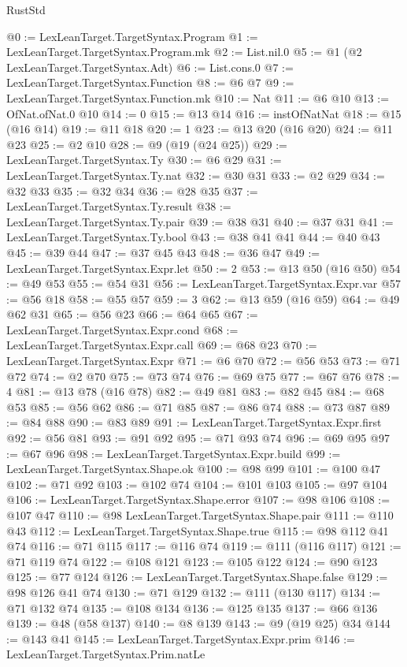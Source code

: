 \begin{lexlean}{RustStd}
\begin{coremodule}
@0 := LexLeanTarget.TargetSyntax.Program
@1 := LexLeanTarget.TargetSyntax.Program.mk
@2 := List.nil.{0}
@5 := @1 (@2 LexLeanTarget.TargetSyntax.Adt)
@6 := List.cons.{0}
@7 := LexLeanTarget.TargetSyntax.Function
@8 := @6 @7
@9 := LexLeanTarget.TargetSyntax.Function.mk
@10 := Nat
@11 := @6 @10
@13 := OfNat.ofNat.{0} @10
@14 := 0
@15 := @13 @14
@16 := instOfNatNat
@18 := @15 (@16 @14)
@19 := @11 @18
@20 := 1
@23 := @13 @20 (@16 @20)
@24 := @11 @23
@25 := @2 @10
@28 := @9 (@19 (@24 @25))
@29 := LexLeanTarget.TargetSyntax.Ty
@30 := @6 @29
@31 := LexLeanTarget.TargetSyntax.Ty.nat
@32 := @30 @31
@33 := @2 @29
@34 := @32 @33
@35 := @32 @34
@36 := @28 @35
@37 := LexLeanTarget.TargetSyntax.Ty.result
@38 := LexLeanTarget.TargetSyntax.Ty.pair
@39 := @38 @31
@40 := @37 @31
@41 := LexLeanTarget.TargetSyntax.Ty.bool
@43 := @38 @41 @41
@44 := @40 @43
@45 := @39 @44
@47 := @37 @45 @43
@48 := @36 @47
@49 := LexLeanTarget.TargetSyntax.Expr.let
@50 := 2
@53 := @13 @50 (@16 @50)
@54 := @49 @53
@55 := @54 @31
@56 := LexLeanTarget.TargetSyntax.Expr.var
@57 := @56 @18
@58 := @55 @57
@59 := 3
@62 := @13 @59 (@16 @59)
@64 := @49 @62 @31
@65 := @56 @23
@66 := @64 @65
@67 := LexLeanTarget.TargetSyntax.Expr.cond
@68 := LexLeanTarget.TargetSyntax.Expr.call
@69 := @68 @23
@70 := LexLeanTarget.TargetSyntax.Expr
@71 := @6 @70
@72 := @56 @53
@73 := @71 @72
@74 := @2 @70
@75 := @73 @74
@76 := @69 @75
@77 := @67 @76
@78 := 4
@81 := @13 @78 (@16 @78)
@82 := @49 @81
@83 := @82 @45
@84 := @68 @53
@85 := @56 @62
@86 := @71 @85
@87 := @86 @74
@88 := @73 @87
@89 := @84 @88
@90 := @83 @89
@91 := LexLeanTarget.TargetSyntax.Expr.first
@92 := @56 @81
@93 := @91 @92
@95 := @71 @93 @74
@96 := @69 @95
@97 := @67 @96
@98 := LexLeanTarget.TargetSyntax.Expr.build
@99 := LexLeanTarget.TargetSyntax.Shape.ok
@100 := @98 @99
@101 := @100 @47
@102 := @71 @92
@103 := @102 @74
@104 := @101 @103
@105 := @97 @104
@106 := LexLeanTarget.TargetSyntax.Shape.error
@107 := @98 @106
@108 := @107 @47
@110 := @98 LexLeanTarget.TargetSyntax.Shape.pair
@111 := @110 @43
@112 := LexLeanTarget.TargetSyntax.Shape.true
@115 := @98 @112 @41 @74
@116 := @71 @115
@117 := @116 @74
@119 := @111 (@116 @117)
@121 := @71 @119 @74
@122 := @108 @121
@123 := @105 @122
@124 := @90 @123
@125 := @77 @124
@126 := LexLeanTarget.TargetSyntax.Shape.false
@129 := @98 @126 @41 @74
@130 := @71 @129
@132 := @111 (@130 @117)
@134 := @71 @132 @74
@135 := @108 @134
@136 := @125 @135
@137 := @66 @136
@139 := @48 (@58 @137)
@140 := @8 @139
@143 := @9 (@19 @25) @34
@144 := @143 @41
@145 := LexLeanTarget.TargetSyntax.Expr.prim
@146 := LexLeanTarget.TargetSyntax.Prim.natLe

\end{coremodule}
\end{lexlean}
